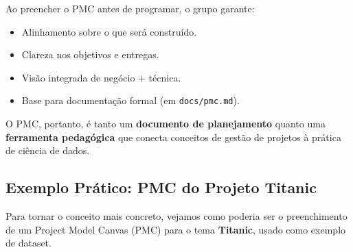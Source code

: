 \documentclass[12pt,a4paper]{article}
\begin{document}
Ao preencher o PMC antes de programar, o grupo garante:

\begin{itemize}
  \item Alinhamento sobre o que será construído.
  \item Clareza nos objetivos e entregas.
  \item Visão integrada de negócio + técnica.
  \item Base para documentação formal (em \texttt{docs/pmc.md}).
\end{itemize}

O PMC, portanto, é tanto um \textbf{documento de planejamento} quanto uma \textbf{ferramenta pedagógica} que conecta conceitos de gestão de projetos à prática de ciência de dados.

\subsection{Exemplo Prático: PMC do Projeto Titanic}

Para tornar o conceito mais concreto, vejamos como poderia ser o preenchimento de um Project Model Canvas (PMC) para o tema \textbf{Titanic}, usado como exemplo de dataset.
\end{document}
